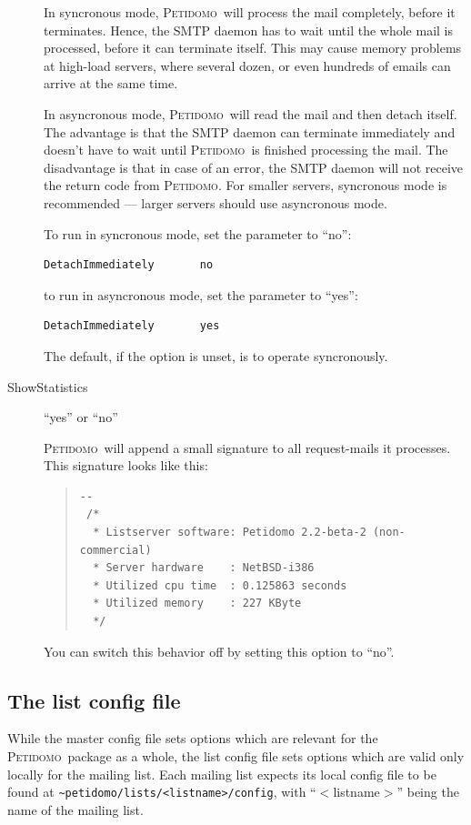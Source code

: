\documentclass[a4paper]{report}
\newcommand{\Petidomo}{{\scshape Peti\-domo}}
\newcommand{\file}[1]{{\tt #1}}
\newcommand{\Index}[1]{#1\index{#1}}
\begin{document}
\begin{description}
In syncronous mode, \Petidomo\ will process the mail completely, before
it terminates. Hence, the SMTP daemon has to wait until the whole mail
is processed, before it can terminate itself. This may cause memory
problems at high-load servers, where several dozen, or even hundreds
of emails can arrive at the same time.

In asyncronous mode, \Petidomo\ will read the mail and then detach
itself. The advantage is that the SMTP daemon can terminate
immediately and doesn't have to wait until \Petidomo\ is finished
processing the mail. The disadvantage is that in case of an error, the
SMTP daemon will not receive the return code from \Petidomo. For
smaller servers, syncronous mode is recommended --- larger servers
should use asyncronous mode.

To run in syncronous mode, set the parameter to ``no'':
\begin{verbatim}
DetachImmediately       no
\end{verbatim}
to run in asyncronous mode, set the parameter to ``yes'':
\begin{verbatim}
DetachImmediately       yes
\end{verbatim}

The default, if the option is unset, is to operate syncronously.

\item[ShowStatistics] \hfill ``yes'' or ``no''

\Petidomo\ will append a small signature to all request-mails it
processes. This signature looks like this:

\begin{quote}
\begin{verbatim}
--
 /*
  * Listserver software: Petidomo 2.2-beta-2 (non-commercial)
  * Server hardware    : NetBSD-i386
  * Utilized cpu time  : 0.125863 seconds
  * Utilized memory    : 227 KByte
  */
\end{verbatim}
\end{quote}

You can switch this behavior off by setting this option to ``no''.

\end{description}

\subsection{The list config file}
\label{list config file}

While the master config file sets options which are relevant for the
\Petidomo\ package as a whole, the \Index{list config file} sets
options which are valid only locally for the mailing list. Each
mailing list expects its local config file to be found at
\file{\~{}petidomo/lists/<listname>/config}, with ``$<$listname$>$''
being the name of the mailing list.
\end{document}

